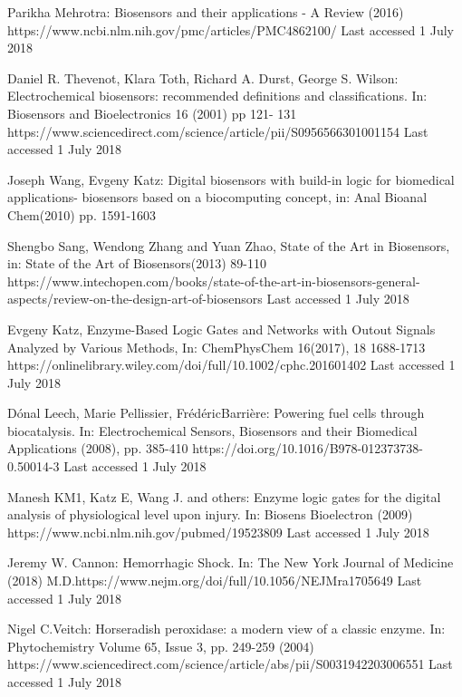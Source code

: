 \documentclass[runningheads]{llncs}
\begin{document}
\begin{thebibliography}{8}
	Parikha Mehrotra: Biosensors and their applications - A Review (2016) https://www.ncbi.nlm.nih.gov/pmc/articles/PMC4862100/ Last accessed 1 July 2018
	
	Daniel R. Thevenot, Klara Toth, Richard A. Durst, George S. Wilson: Electrochemical biosensors: recommended definitions and classifications. In: Biosensors and Bioelectronics 16 (2001) pp 121- 131 https://www.sciencedirect.com/science/article/pii/S0956566301001154 Last accessed 1 July 2018
	
	Joseph Wang, Evgeny Katz: Digital biosensors with build-in logic for biomedical applications- biosensors based on a biocomputing concept, in: Anal Bioanal Chem(2010) pp. 1591-1603 
	
	Shengbo Sang, Wendong Zhang and Yuan Zhao, State of the Art in Biosensors, in: State of the Art of Biosensors(2013) 89-110 https://www.intechopen.com/books/state-of-the-art-in-biosensors-general-aspects/review-on-the-design-art-of-biosensors Last accessed 1 July 2018
	
	Evgeny Katz, Enzyme-Based Logic Gates and Networks with Outout Signals Analyzed by Various Methods, In: ChemPhysChem 16(2017), 18 1688-1713 https://onlinelibrary.wiley.com/doi/full/10.1002/cphc.201601402 Last accessed 1 July 2018
	
	Dónal Leech, Marie Pellissier, FrédéricBarrière: Powering fuel cells through biocatalysis. In: Electrochemical Sensors, Biosensors and their Biomedical Applications (2008), pp. 385-410 https://doi.org/10.1016/B978-012373738-0.50014-3 Last accessed 1 July 2018
	
	Manesh KM1, Katz E, Wang J. and others:
	Enzyme logic gates for the digital analysis of physiological level upon injury. In: Biosens Bioelectron (2009) https://www.ncbi.nlm.nih.gov/pubmed/19523809 Last accessed 1 July 2018
	
	Jeremy W. Cannon: Hemorrhagic Shock. In: The New York Journal of Medicine (2018) M.D.https://www.nejm.org/doi/full/10.1056/NEJMra1705649 Last accessed 1 July 2018
	
	Nigel C.Veitch: Horseradish peroxidase: a modern view of a classic enzyme. In: Phytochemistry
	Volume 65, Issue 3, pp. 249-259 (2004)
	https://www.sciencedirect.com/science/article/abs/pii/S0031942203006551  Last accessed 1 July 2018
	
	
\end{thebibliography}
\end{document}

